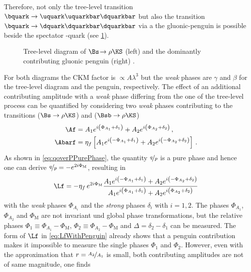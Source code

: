 Therefore, not only the tree-level transition $\bquark\to\uquark\uquarkbar\dquarkbar$ but also the transition $\bquark\to\dquark\dquarkbar\dquarkbar$ via a the gluonic-penguin is possible beside the spectator \squark-quark (see \cref{fig:Bs2RhoKS}).
\begin{figure}[tbp]
	\centering
	
	
	\caption{Tree-level diagram of $\Bs\!\to\rho\KS$ (left) and the dominantly contributing gluonic penguin (right) \cite{Ellis:2016jkw}.}
	\label{fig:Bs2RhoKS}
\end{figure}
For both diagrams the CKM factor is $\propto\!A\lambda^3$ but the \emph{weak} phases are $\gamma$ and $\beta$ for the tree-level diagram and the penguin, respectively.
The effect of an additional contributing amplitude with a \emph{weak} phase differing from the one of the tree-level process can be quantified by considering two \emph{weak} phases contributing to the transitions \Af ($\Bs\to\rho\KS$) and \Abarf ($\Bsb\to\rho\KS$)
\begin{equation}
\begin{aligned}
\Af&=A_1e^{i\left(\Phi_{A_1}+\delta_1\right)}+A_2e^{i\left(\Phi_{A_2}+\delta_2\right)}\,,\\
\Abarf&=\eta_f\left[A_1e^{i\left(-\Phi_{A_1}+\delta_1\right)}+A_2e^{i\left(-\Phi_{A_2}+\delta_2\right)}\right]\,.
\end{aligned}
\end{equation}
As shown in \cref{eq:qoverPPurePhase}, the quantity $\nicefrac{q}{p}$ is a pure phase and hence one can derive \mbox{$\nicefrac{q}{p}=-e^{2i\Phi_\text{M}}$}, resulting in
\begin{equation}
\Lf=-\eta_f\,e^{2i\Phi_\text{M}}\frac{ A_1 e^{i\left(-\Phi_{A_1}+\delta_1\right)} + A_2 e^{i\left(-\Phi_{A_2}+\delta_2\right)}}{A_1e^{i\left(\Phi_{A_1}+\delta_1\right)}+A_2e^{i\left(\Phi_{A_2}+\delta_2\right)}} \label{eq:LfWithPenguin}
\end{equation}
with the \emph{weak} phases $\Phi_{A_i}$ and the \emph{strong} phases $\delta_i$ with $i=1,2$.
The phases $\Phi_{A_1}$, $\Phi_{A_2}$ and $\Phi_\text{M}$ are not invariant und global phase transformations, but the relative phases \mbox{$\Phi_1\equiv\Phi_{A_1}-\Phi_\text{M}$}, \mbox{$\Phi_2\equiv\Phi_{A_2}-\Phi_\text{M}$} and $\Delta=\delta_2-\delta_1$ can be measured.
The form of $\Lf$ in \cref{eq:LfWithPenguin} already shows that a penguin contribution makes it impossible to measure the single phases $\Phi_1$ and $\Phi_2$.
However, even with the approximation that $r=\nicefrac{A_2}{A_1}$ is small, \ie both contributing amplitudes are not of same magnitude, one finds
